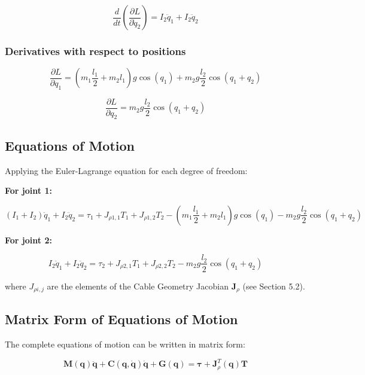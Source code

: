 \begin{equation}
\frac{d}{dt}\left(\frac{\partial L}{\partial \dot{q}_2}\right) = I_2 \ddot{q}_1 + I_2 \ddot{q}_2
\end{equation}

\subsubsection{Derivatives with respect to positions}

\begin{equation}
\frac{\partial L}{\partial q_1} = \left(m_1 \frac{l_1}{2} + m_2 l_1\right) g \cos(q_1) + m_2 g \frac{l_2}{2} \cos(q_1 + q_2)
\end{equation}

\begin{equation}
\frac{\partial L}{\partial q_2} = m_2 g \frac{l_2}{2} \cos(q_1 + q_2)
\end{equation}

\subsection{Equations of Motion}

Applying the Euler-Lagrange equation for each degree of freedom:

\textbf{For joint 1:}

\begin{equation}
(I_1 + I_2) \ddot{q}_1 + I_2 \ddot{q}_2 = \tau_1 + J_{\rho1,1} T_1 + J_{\rho1,2} T_2 - \left(m_1 \frac{l_1}{2} + m_2 l_1\right) g \cos(q_1) - m_2 g \frac{l_2}{2} \cos(q_1 + q_2)
\end{equation}

\textbf{For joint 2:}

\begin{equation}
I_2 \ddot{q}_1 + I_2 \ddot{q}_2 = \tau_2 + J_{\rho2,1} T_1 + J_{\rho2,2} T_2 - m_2 g \frac{l_2}{2} \cos(q_1 + q_2)
\end{equation}

where $J_{\rho i,j}$ are the elements of the Cable Geometry Jacobian $\mathbf{J}_{\rho}$ (see Section 5.2).

\subsection{Matrix Form of Equations of Motion}

The complete equations of motion can be written in matrix form:

\begin{equation}
\boxed{\mathbf{M}(\mathbf{q}) \ddot{\mathbf{q}} + \mathbf{C}(\mathbf{q}, \dot{\mathbf{q}}) \dot{\mathbf{q}} + \mathbf{G}(\mathbf{q}) = \boldsymbol{\tau} + \mathbf{J}_{\rho}^T(\mathbf{q}) \mathbf{T}}
\end{equation}

